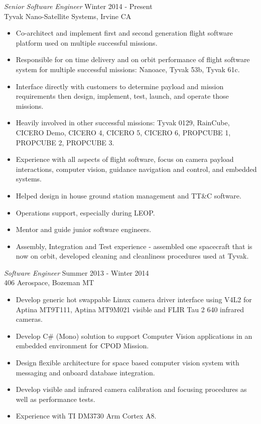 \documentclass[line,margin]{res}
\begin{document}
\begin{resume}
				{\sl Senior Software Engineer} \hfill Winter 2014 - Present \\
				 Tyvak Nano-Satellite Systems, Irvine CA
				\begin{itemize}  \itemsep -2pt %
					\item Co-architect and implement first and second generation flight software platform used on multiple successful missions.
					\item Responsible for on time delivery and on orbit performance of flight software system for multiple successful missions: Nanoace, Tyvak 53b, Tyvak 61c.
					\item Interface directly with customers to determine payload and mission requirements then design, implement, test, launch, and operate those missions.
					\item Heavily involved in other successful missions: Tyvak 0129, RainCube, CICERO Demo, CICERO 4, CICERO 5, CICERO 6, PROPCUBE 1, PROPCUBE 2, PROPCUBE 3.
					\item Experience with all aspects of flight software, focus on camera payload interactions, computer vision, guidance navigation and control, and embedded systems.
					\item Helped design in house ground station management and TT\&C software.
					\item Operations support, especially during LEOP.
					\item Mentor and guide junior software engineers.
					\item Assembly, Integration and Test experience - assembled one spacecraft that is now on orbit, developed cleaning and cleanliness procedures used at Tyvak.
				\end{itemize}

				{\sl Software Engineer} \hfill Summer 2013 - Winter 2014 \\
                  406 Aerospace, Bozeman MT
                 \begin{itemize}  \itemsep -2pt %
                 \item Develop generic hot swappable Linux camera driver interface using V4L2 for Aptina MT9T111, Aptina MT9M021 visible and FLIR Tau 2 640 infrared cameras. 
                 \item Develop C\# (Mono) solution to support Computer Vision applications in an embedded environment for CPOD Mission.
                 \item Design flexible architecture for space based computer vision system with messaging and onboard database integration.
                 \item Develop visible and infrared camera calibration and focusing procedures as well as performance tests.
                 \item Experience with TI DM3730 Arm Cortex A8.
                 

\end{itemize}
\end{resume}
\end{document}
